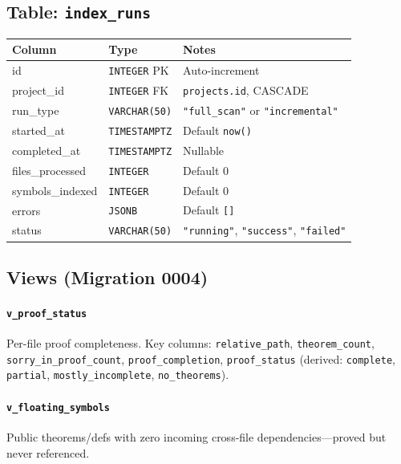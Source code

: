 \subsection{Table: \texttt{index\_runs}}

\begin{longtable}{@{}llp{6cm}@{}}
\toprule
\textbf{Column} & \textbf{Type} & \textbf{Notes} \\
\midrule
\endfirsthead
\bottomrule
\endfoot
id                & \texttt{INTEGER} PK    & Auto-increment \\
project\_id       & \texttt{INTEGER} FK    & \texttt{projects.id}, CASCADE \\
run\_type         & \texttt{VARCHAR(50)}    & \texttt{"full\_scan"} or \texttt{"incremental"} \\
started\_at       & \texttt{TIMESTAMPTZ}    & Default \texttt{now()} \\
completed\_at     & \texttt{TIMESTAMPTZ}    & Nullable \\
files\_processed  & \texttt{INTEGER}        & Default 0 \\
symbols\_indexed  & \texttt{INTEGER}        & Default 0 \\
errors            & \texttt{JSONB}          & Default \texttt{[]} \\
status            & \texttt{VARCHAR(50)}    & \texttt{"running"}, \texttt{"success"}, \texttt{"failed"} \\
\end{longtable}

\subsection{Views (Migration 0004)}

\paragraph{\texttt{v\_proof\_status}} Per-file proof completeness.
Key columns: \texttt{relative\_path}, \texttt{theorem\_count},
\texttt{sorry\_in\_proof\_count}, \texttt{proof\_completion},
\texttt{proof\_status} (derived: \texttt{complete}, \texttt{partial},
\texttt{mostly\_incomplete}, \texttt{no\_theorems}).

\paragraph{\texttt{v\_floating\_symbols}} Public theorems/defs with zero
incoming cross-file dependencies---proved but never referenced.

